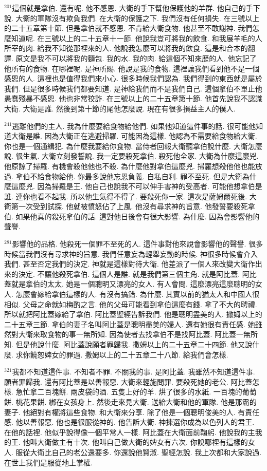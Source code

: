 \documentclass{book}
\begin{document}
$^{201}$這個就是拿伯.
還有呢.
他不感恩.
大衛的手下幫他保護他的羊群.
他自己的手下說.
大衛的軍隊沒有欺負我們.
在大衛的保護之下.
我們沒有任何損失.
在三號以上的二十五章第十節.
但是拿伯就不感恩.
不肯給大衛食物.
他甚至不敢謝神.
我們怎麼知道呢.
在三號以上的二十五章十一節.
他說我豈可將我的飲食.
和我展羊毛的人所宰的肉.
給我不知從那裡來的人.
他說我怎麼可以將我的飲食.
這是和合本的翻譯.
原文是我不可以將我的麵包.
我的水.
我的肉.
給這個不知來歷的人.
他忘記了他所有的食物.
在哪裡呢.
是神所賜.
他說是我的食物.
這裡讓我們看到他不是一個感恩的人.
這裡也是值得我們來小心.
很多時候我們認為.
我們得到的東西就是屬於我們.
但是很多時候我們都要知道.
是神給我們而不是我們自己.
這個拿伯不單止他愚蠢殘暴不感恩.
他也非常狡詐.
在三號以上的二十五章第十節.
他首先說我不認識大衛.
大衛是誰.
然後到第十節的尾他怎麼說.
現在有很多損益主人的僕人.

$^{241}$逃離他們的主人.
我為什麼要給食物給他們.
如果他知道這件事的話.
很可能他知道大衛是誰.
因為大衛正在逃避掃羅.
可能因為這樣.
他認為不需要給食物給大衛.
你也是一個通緝犯.
為什麼我要給你食物.
當侍者回報大衛聽拿伯說什麼.
大衛怎麼說.
很生氣.
大衛立刻發誓說.
我一定要殺死拿伯.
殺死他全家.
大衛為什麼這麼兇.
他原諒了掃羅.
有機會殺他他也不殺.
為什麼他對拿伯這麼兇.
掃羅想殺他他也能放過.
拿伯不給食物給他.
你最多說他忘恩負義.
自私自利.
罪不至死.
但是大衛為什麼這麼兇.
因為掃羅是王.
他自己也說我不可以伸手害神的受高者.
可能他想拿伯是誰.
連你也看不起我.
所以他生氣得不得了.
要殺死你一家.
這次是薩姆爾死後.
大衛第一次受到試探.
他就被憤怒佔了上風.
他沒有尋求神的旨意.
他發誓要殺死拿伯.
如果他真的殺死拿伯的話.
這對他日後會有很大影響.
為什麼.
因為會影響他的聲譽.

$^{281}$影響他的品格.
他殺死一個罪不至死的人.
這件事對他來說會影響他的聲譽.
很多時候當我們沒有尋求神的旨意.
我們任意妄為輕舉妄動的時候.
神很多時候會介入我們.
甚至否定我們的決定.
神就是這樣對待大衛.
他差派了一個人來改變大衛作出來的決定.
不讓他殺死拿伯.
這個人是誰.
就是我們第三個主角.
就是阿比蓋.
阿比蓋就是拿伯的太太.
她是一個聰明又漂亮的女人.
有人會問.
這麼漂亮這麼聰明的女人.
怎麼會嫁給拿伯這樣的人.
有沒有搞錯.
為什麼.
其實以前的猶太人和中國人很相似.
父母之命就如梅酌之言.
他的父母可能看到拿伯這麼有錢.
拿了不大的聘禮.
所以就把阿比蓋嫁給了拿伯.
阿比蓋聖經告訴我們.
他是聰明盡美的人.
撒姆以上的二十五章三節.
拿伯的妻子名叫阿比蓋是聰明盡美的婦人.
還有她很有責任感.
她雖然對大衛來取食物的事一無所知.
因為使者去找拿伯不是找阿比蓋.
阿比蓋一無所知.
但是他說什麼.
阿比蓋說願者罪歸我.
撒姆以上的二十五章二十四節.
他又說什麼.
求你饒恕婢女的罪過.
撒姆以上的二十五章二十八節.
給我們會怎樣.

$^{321}$我都不知道這件事.
不知者不罪.
不關我的事.
是阿比蓋.
我雖然不知道這件事.
願者罪歸我.
還有阿比蓋是以善報惡.
大衛來輕施問罪.
要殺死她的老公.
阿比蓋怎樣.
急忙拿二百塊餅.
兩皮袋的酒.
五隻上好的羊.
烘了很多的水紙.
一百塊的葡萄餅.
桃花果餅.
綁在女孩身上.
然後走來見大衛.
送給大衛和他的軍隊.
他是那霸的妻子.
他絕對有權將這些食物.
和大衛來分享.
除了他是一個聰明俊美的人.
有責任感.
他以善報惡.
他也是很服從神的.
他告訴大衛.
神揀選你成為以色列人的君王.
在他的話裡.
他似乎說得像一個平常人一樣.
阿比蓋在大衛面前鞠躬.
他說我的主我的王.
他叫大衛做主有十次.
他叫自己做大衛的婢女有六次.
你說哪裡有這樣的女人.
服從大衛比自己的老公還要多.
你還說他賢淑.
聖經怎說.
我上次都和大家說過.
在世上我們是服從地上掌權.
\end{document}
